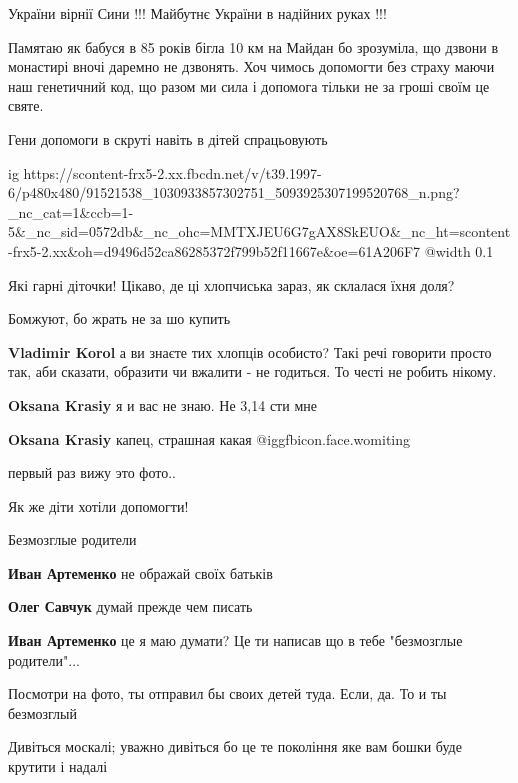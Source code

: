 України вірнії Сини !!!
Майбутнє України в надійних руках !!!


Памятаю як бабуся в 85 років бігла 10 км на Майдан бо зрозуміла, що дзвони в
монастирі вночі даремно не дзвонять. Хоч чимось допомогти без страху маючи наш
генетичний код, що разом ми сила і допомога тільки не за гроші своїм це святе.

Гени допомоги в скруті навіть в дітей спрацьовують


\ifcmt
  ig https://scontent-frx5-2.xx.fbcdn.net/v/t39.1997-6/p480x480/91521538_1030933857302751_5093925307199520768_n.png?_nc_cat=1&ccb=1-5&_nc_sid=0572db&_nc_ohc=MMTXJEU6G7gAX8SkEUO&_nc_ht=scontent-frx5-2.xx&oh=d9496d52ca86285372f799b52f11667e&oe=61A206F7
  @width 0.1
\fi

Які гарні діточки! Цікаво, де ці хлопчиська зараз, як склалася їхня доля?

\begin{itemize} %
Бомжуют, бо жрать не за шо купить

\textbf{Vladimir Korol} а ви знаєте тих хлопців особисто? Такі речі говорити просто так, аби сказати, образити чи вжалити - не годиться. То честі не робить нікому.

\textbf{Oksana Krasiy} я и вас не знаю. Не 3,14 сти мне

\textbf{Oksana Krasiy} капец, страшная какая  @igg{fbicon.face.womiting} 
\end{itemize} %

первый раз вижу это фото..

Як же діти хотіли допомогти!

Безмозглые родители

\begin{itemize} %
\textbf{Иван Артеменко} не ображай своїх батьків

\textbf{Олег Савчук} думай прежде чем писать

\textbf{Иван Артеменко} це я маю думати? Це ти написав що в тебе "безмозглые родители"...

Посмотри на фото, ты отправил бы своих детей туда. Если, да. То и ты безмозглый
\end{itemize} %


Дивіться москалі; уважно дивіться бо це те покоління яке вам бошки буде
крутити і надалі
